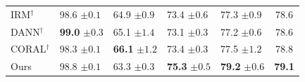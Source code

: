 \begin{table}[H]
\begin{tabular}{lllll|c}
IRM$^\dagger$ & 98.6 \scriptsize$\pm0.1$ & 64.9 \scriptsize$\pm0.9$ & 73.4 \scriptsize$\pm0.6$ & 77.3 \scriptsize$\pm0.9$ & 78.6 \\
DANN$^\dagger$ & \textbf{99.0} \scriptsize$\pm0.3$ & 65.1 \scriptsize$\pm1.4$ & 73.1 \scriptsize$\pm0.3$ & 77.2 \scriptsize$\pm0.6$ & 78.6 \\
CORAL$^\dagger$ & 98.3 \scriptsize$\pm0.1$ & \textbf{66.1} \scriptsize$\pm1.2$ & 73.4 \scriptsize$\pm0.3$ & 77.5 \scriptsize$\pm1.2$ & 78.8 \\
\midrule
Ours & 98.8 \scriptsize$\pm0.1$ & 63.3 \scriptsize$\pm0.3$ & \textbf{75.3} \scriptsize$\pm0.5$ & \textbf{79.2} \scriptsize$\pm0.6$ & \textbf{79.1} \\
\bottomrule
\end{tabular}
\end{table}